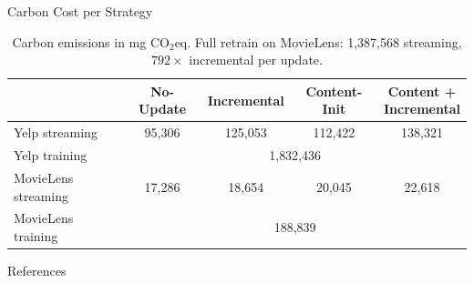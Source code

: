 \begin{frame}{Carbon Cost per Strategy}
    \begin{table}[h]
\centering
\def\arraystretch{1.6}%
\begin{tabular}{lcccc}
\toprule
 & No-Update & Incremental & Content-Init & \makecell{Content +\\Incremental} \\
\midrule
Yelp streaming & 95{,}306 & 125{,}053 & 112{,}422 & 138{,}321 \\
Yelp training & \multicolumn{4}{c}{1{,}832{,}436} \\
MovieLens streaming & 17{,}286 & 18{,}654 & 20{,}045 & 22{,}618 \\
MovieLens training & \multicolumn{4}{c}{188{,}839} \\
\bottomrule
\end{tabular}
\caption*{Carbon emissions in mg CO$_2$eq. Full retrain on MovieLens: 1{,}387{,}568 streaming, $792\times$ incremental per update.}
\end{table}
\end{frame}


\begin{frame}[allowframebreaks]{References}
    \scriptsize
    \printbibliography[heading=none]
\end{frame}
